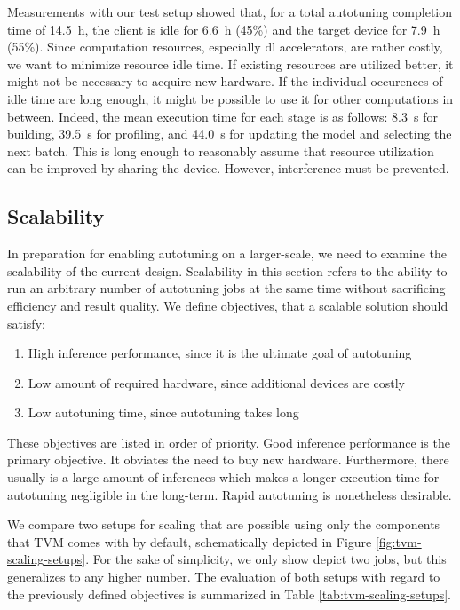 Measurements with our test setup showed that, for a total autotuning completion time of \SI{14.5}{\hour}, the client is idle for \SI{6.6}{\hour} (45\%) and the target device for \SI{7.9}{\hour} (55\%). Since computation resources, especially \gls{dl} accelerators, are rather costly, we want to minimize resource idle time. If existing resources are utilized better, it might not be necessary to acquire new hardware. If the individual occurences of idle time are long enough, it might be possible to use it for other computations in between. Indeed, the mean execution time for each stage is as follows: \SI{8.3}{\second} for building, \SI{39.5}{\second} for profiling, and \SI{44.0}{\second} for updating the model and selecting the next batch. This is long enough to reasonably assume that resource utilization can be improved by sharing the device. However, \gls{interference} must be prevented.

\subsection{Scalability}\label{sec:scalability}
In preparation for enabling autotuning on a larger-scale, we need to examine the scalability of the current design. Scalability in this section refers to the ability to run an arbitrary number of autotuning jobs at the same time without sacrificing efficiency and result quality. We define objectives, that a scalable solution should satisfy:
\begin{enumerate}
	\item High inference performance, since it is the ultimate goal of autotuning
	\item Low amount of required hardware, since additional devices are costly
	\item Low autotuning time, since autotuning takes long
\end{enumerate}
These objectives are listed in order of priority. Good inference performance is the primary objective. It obviates the need to buy new hardware. Furthermore, there usually is a large amount of inferences which makes a longer execution time for autotuning negligible in the long-term. Rapid autotuning is nonetheless desirable.

We compare two setups for scaling that are possible using only the components that TVM comes with by default, schematically depicted in Figure \ref{fig:tvm-scaling-setups}. For the sake of simplicity, we only show depict two jobs, but this generalizes to any higher number. The evaluation of both setups with regard to the previously defined objectives is summarized in Table \ref{tab:tvm-scaling-setups}.

